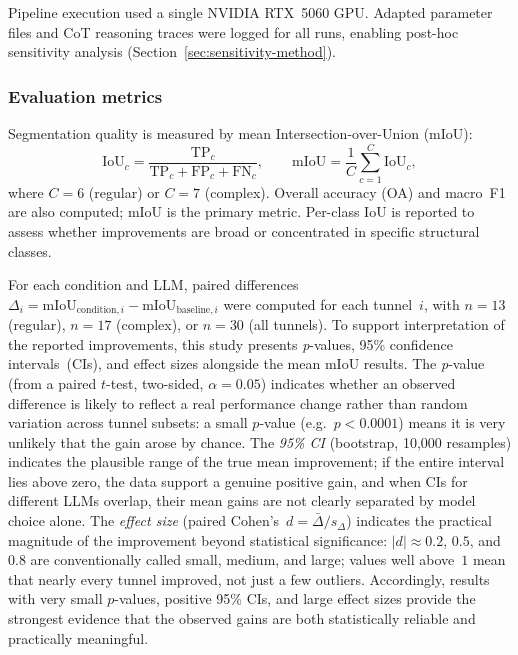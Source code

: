 \documentclass[a4paper,fleqn]{cas-dc}
\begin{document}
Pipeline execution used a single NVIDIA RTX~5060 GPU. Adapted parameter files and CoT reasoning traces were logged for all runs, enabling post-hoc sensitivity analysis (Section~\ref{sec:sensitivity-method}).

\subsubsection{Evaluation metrics}\label{sec:metrics}

Segmentation quality is measured by mean Intersection-over-Union (mIoU):
\begin{equation}
\text{IoU}_c = \frac{\text{TP}_c}{\text{TP}_c + \text{FP}_c + \text{FN}_c}, \qquad
\text{mIoU} = \frac{1}{C} \sum_{c=1}^{C} \text{IoU}_c,
\end{equation}
where $C = 6$ (regular) or $C = 7$ (complex). Overall accuracy (OA) and macro~F1 are also computed; mIoU is the primary metric. Per-class IoU is reported to assess whether improvements are broad or concentrated in specific structural classes.

For each condition and LLM, paired differences $\Delta_i = \text{mIoU}_{\text{condition},i} - \text{mIoU}_{\text{baseline},i}$ were computed for each tunnel~$i$, with $n = 13$ (regular), $n = 17$ (complex), or $n = 30$ (all tunnels). To support interpretation of the reported improvements, this study presents \emph{p}-values, 95\% confidence intervals~(CIs), and effect sizes alongside the mean mIoU results. The \emph{p}-value (from a paired $t$-test, two-sided, $\alpha = 0.05$) indicates whether an observed difference is likely to reflect a real performance change rather than random variation across tunnel subsets: a small $p$-value (e.g.\ $p < 0.0001$) means it is very unlikely that the gain arose by chance. The \emph{95\% CI} (bootstrap, 10{,}000 resamples) indicates the plausible range of the true mean improvement; if the entire interval lies above zero, the data support a genuine positive gain, and when CIs for different LLMs overlap, their mean gains are not clearly separated by model choice alone. The \emph{effect size} (paired Cohen's~$d = \bar{\Delta} / s_\Delta$) indicates the practical magnitude of the improvement beyond statistical significance: $|d| \approx 0.2$, $0.5$, and $0.8$ are conventionally called small, medium, and large; values well above~$1$ mean that nearly every tunnel improved, not just a few outliers. Accordingly, results with very small $p$-values, positive 95\% CIs, and large effect sizes provide the strongest evidence that the observed gains are both statistically reliable and practically meaningful.
\end{document}
